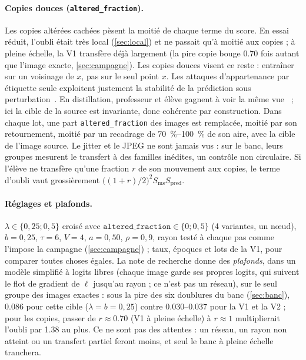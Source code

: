 \documentclass[11pt,a4paper]{article}
\newcommand{\code}[1]{\texttt{#1}}
\begin{document}
\paragraph{Copies douces (\code{altered\_fraction}).} Les copies altérées cachées pèsent la moitié
de chaque terme du score. En essai réduit, l'oubli était très local (\cref{sec:local}) et ne passait
qu'à moitié aux copies ; à pleine échelle, la V1 transfère déjà largement (la pire copie bouge
\num{0.70} fois autant que l'image exacte, \cref{sec:campagne}). Les copies douces visent ce reste :
entraîner sur un voisinage de $x$, pas sur le seul point $x$. Les attaques d'appartenance par étiquette seule
exploitent justement la stabilité de la prédiction sous perturbation~\cite{choquettechoo2021}. En
distillation, professeur et élève gagnent à voir la même vue~\cite{beyer2022} ; ici la cible de la
source est invariante, donc cohérente par construction. Dans chaque lot, une part
\code{altered\_fraction} des images est remplacée, moitié par son retournement, moitié par un
recadrage de \SIrange{70}{100}{\percent} de son aire, avec la cible de l'image source. Le jitter
et le JPEG ne sont jamais vus : sur le banc, leurs groupes mesurent le transfert à des familles
inédites, un contrôle non circulaire. Si l'élève ne transfère qu'une fraction $r$ de son mouvement
aux copies, le terme d'oubli vaut grossièrement $\bigl((1+r)/2\bigr)^2S_{\text{ms}}S_{\text{pred}}$.

\paragraph{Réglages et plafonds.} $\lambda\in\{0{,}25;0{,}5\}$ croisé avec
$\code{altered\_fraction}\in\{0;0{,}5\}$ (4 variantes, un nœud), $b=0{,}25$, $\tau=6$, $V=4$,
$a=0{,}50$, $\rho=0{,}9$, rayon testé à chaque pas comme l'impose la campagne
(\cref{sec:campagne}) ; taux, époques et lots de la V1, pour comparer toutes choses égales. La
note de recherche donne des \emph{plafonds}, dans un modèle simplifié à logits libres (chaque image
garde ses propres logits, qui suivent le flot de gradient de $\ell$ jusqu'au rayon ; ce n'est pas
un réseau), sur le seul groupe des images exactes : sous la pire des six doublures du banc
(\cref{sec:banc}), \num{0.086} pour cette cible ($\lambda=b=0{,}25$) contre \numrange{0.030}{0.037}
pour la V1 et la V2 ; pour les copies, passer de $r\approx\num{0.70}$ (V1 à pleine échelle) à
$r\approx1$ multiplierait l'oubli par \num{1.38} au plus. Ce ne sont pas des
attentes : un réseau, un rayon non atteint ou un transfert partiel feront moins, et seul le banc à
pleine échelle tranchera.
\end{document}
